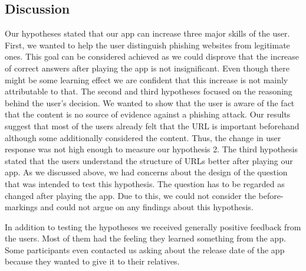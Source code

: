 \subsection{Discussion}
Our hypotheses stated that our app can increase three major skills of the user.
First, we wanted to help the user distinguish phishing websites from legitimate ones.
This goal can be considered achieved as we could disprove that the increase of correct answers after playing the app is not insignificant.
Even though there might be some learning effect we are confident that this increase is not mainly attributable to that.
The second and third hypotheses focused on the reasoning behind the user's decision.
We wanted to show that the user is aware of the fact that the content is no source of evidence against a phishing attack.
Our results suggest that most of the users already felt that the URL is important beforehand although some additionally considered the content.
Thus, the change in user response was not high enough to measure our hypothesis 2. 
The third hypothesis stated that the users understand the structure of URLs better after playing our app.
As we discussed above, we had concerns about the design of the question that was intended to test this hypothesis.
The question has to be regarded as changed after playing the app.
Due to this, we could not consider the before-markings and could not argue on any findings about this hypothesis.

In addition to testing the hypotheses we received generally positive feedback from the users.
Most of them had the feeling they learned something from the app.
Some participants even contacted us asking about the release date of the app because they wanted to give it to their relatives.

